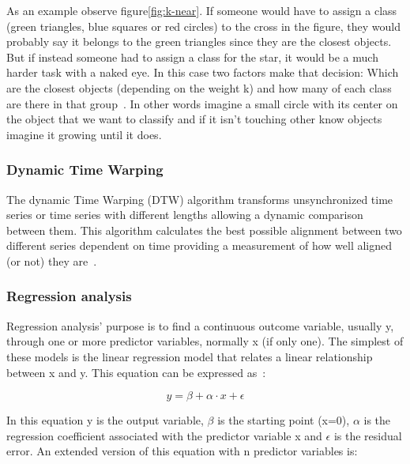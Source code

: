 As an example observe figure\ref{fig:k-near}. If someone would have to assign a class (green triangles, blue squares or red circles) to the cross in the figure, they would probably say it belongs to the green triangles since 
they are the closest objects. But if instead someone had to assign a class for the star, it would be a much harder task with a naked eye. 
In this case two factors make that decision: Which are the closest objects (depending on the weight k) and how many of each class are there in that group~\cite{bachelorInsole}. In other words 
imagine a small circle with its center on the object that we want to classify and if it isn't touching other know objects imagine it growing until it does.


 
\subsubsection{Dynamic Time Warping}
\label{sssec:dynamic_time_warping}

The dynamic Time Warping (DTW) algorithm transforms unsynchronized time series or time series with different lengths allowing a dynamic comparison between them. This algorithm calculates 
the best possible alignment between two different series dependent on time providing a measurement of how well aligned (or not) they are~\cite{bachelorInsole}.

\subsubsection{Regression analysis}
\label{sssec:regression_analysis}

Regression analysis' purpose is to find a continuous outcome variable, usually y, through one or more predictor variables, normally x (if only one). The simplest of these models is the 
linear regression model that relates a linear relationship between x and y. This equation can be expressed as~\cite{bachelorInsole}:

\begin{equation}
  y = \beta + \alpha \cdot x + \epsilon
  \label{eq:regAnalEQ}
\end{equation}

In this equation y is the output variable, $\beta$ is the starting point (x=0), $\alpha$ is the regression coefficient associated with the predictor variable x and $\epsilon$ is the residual error.
An extended version of this equation with n predictor variables is:

